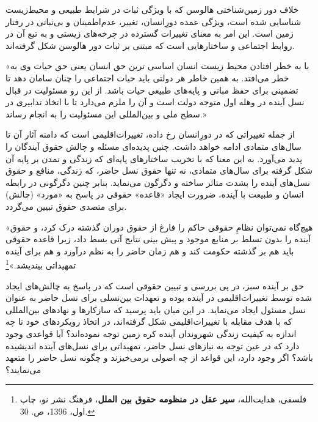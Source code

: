 \begin{enumerate}
	خلاف دور زمین‌شناختی هالوسن که با ویژگی ثبات در شرایط طبیعی و محیط‌زیست شناسایی شده است، ویژگی عمده دورِ‌انسان،  تغییر، عدم‌اطمینان و بی‌ثباتی در رفتار زمین است. این امر به معنای تغییرات گسترده در چرخه‌های زیستی و به تبع آن در روابط اجتماعی و ساختار‌هایی است که مبتنی بر ثبات دور هالوسن شکل گرفته‌اند.
	
	
«با به خطر افتادن محیط زیست انسان اساسی ترین حق انسان یعنی حق حیات وی به خطر می‌افتد. به همین خاطر هر دولتی باید حیات اجتماعی را چنان سامان دهد تا تضمینی برای حفظ مبانی و پایه‌های طبیعی حیات باشد. از این رو مسئولیت در قبال نسل آینده در وهله اول متوجه دولت است و آن را ملزم می‌دارد تا با اتخاذ تدابیری در سطح ملی و بین‌المللی این مسئولیت را به انجام رساند.»
	
	از جمله تغییراتی که در دورِانسان رخ داده، تغییرات‌اقلیمی است که دامنه آثار آن تا سال‌های متمادی ادامه خواهد داشت.
	چنین پدیده‌ای مسئله‌ و چالش حقوق آیندگان را پدید می‌آورد. به این معنا که با تخریب ساختار‌های پایه‌ای که زندگی و تمدن بر پایه آن شکل گرفته برای سال‌های متمادی، نه تنها حقوق نسل حاضر، که زندگی، منافع و حقوق نسل‌های آینده را بشدت متاثر ساخته و دگرگون می‌نماید. بنابر چنین دگرگونی در رابطه انسان و طبیعت با آینده، ضرورت ایجاد «قاعده» حقوقی در پاسخ به «مورد» (چالش) برای متصدی حقوق تبیین می‌گردد.
	
	
	«هیچ‌گاه نمی‌توان نظامِ حقوقی حاکم را فارغ از حقوق دوران گذشته درک کرد، و حقوق آینده را بدون تسلط بر منابع موجود و پیش بینی نتایج آتی بسط داد، زیرا قاعده حقوقی باید هم بر گذشته حکومت کند و هم زمان حاضر را به نظم درآورد و هم برای آینده تمهیداتی بیندیشد.»\footnote{فلسفی، هدایت‌الله، \textbf{سیر عقل در منظومه حقوق بین الملل}، فرهنگ نشر نو، چاپ اول، 1396، ص. 30.}
	
	حق بر آینده سبز، در پی بررسی و تبیین حقوقی است که در پاسخ به چالش‌های ایجاد شده توسط تغییرات‌اقلیمی در آینده بوده و تعهدات بین‌نسلی برای نسل حاضر به عنوان نسل مسئول ایجاد می‌نماید. در این میان باید پرسید که سازکارها و نهاد‌های بین‌المللی که با هدف مقابله با تغییرات‌اقلیمی شکل گرفته‌اند، در اتخاذ رویکرد‌های خود تا چه اندازه به کیفیت زندگی شهروندان آینده کره زمین توجه نموده‌اند؟ آیا قواعدی وجود دارد که در عین توجه به نیاز‌های نسل حاضر، تمهیداتی برای نسل‌های آینده اندیشیده باشد؟ اگر وجود دارد، این قواعد از چه اصولی برمی‌خیزند و چگونه نسل حاضر را متعهد می‌نمایند؟



\end{enumerate}
